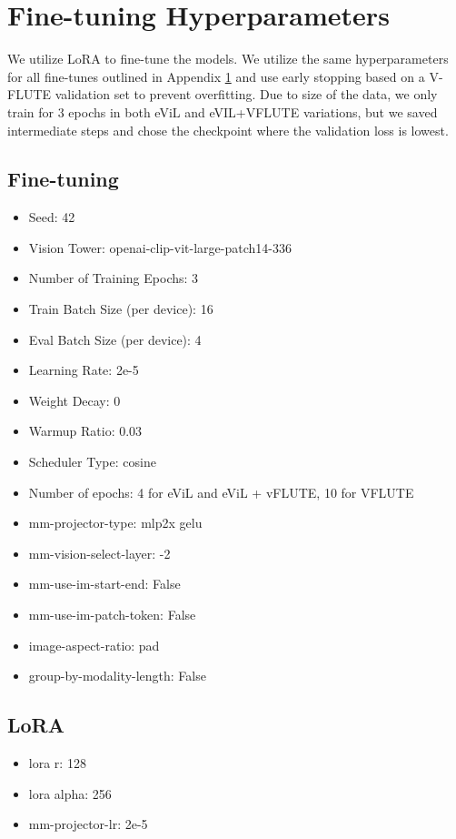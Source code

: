 \section{Fine-tuning Hyperparameters} \label{app:hyper}

We utilize LoRA \cite{hu2022lora} to fine-tune the models. We utilize the same hyperparameters for all fine-tunes outlined in Appendix \ref{app:hyper} and use early stopping based on a V-FLUTE validation set to prevent overfitting. Due to size of the data, we only train for 3 epochs in both eViL and eVIL+VFLUTE variations, but we saved intermediate steps and chose the checkpoint where the validation loss is lowest. 

\subsection*{Fine-tuning}
\begin{itemize}
    \item Seed: 42
    \item Vision Tower: openai-clip-vit-large-patch14-336
    \item Number of Training Epochs: 3
    \item Train Batch Size (per device): 16
    \item Eval Batch Size (per device): 4
    \item Learning Rate: 2e-5
    \item Weight Decay: 0
    \item Warmup Ratio: 0.03
    \item Scheduler Type: cosine
    \item Number of epochs: 4 for eViL and eViL + vFLUTE, 10 for VFLUTE
    \item mm-projector-type: mlp2x gelu 
    \item mm-vision-select-layer: -2 
    \item mm-use-im-start-end: False 
    \item mm-use-im-patch-token: False 
    \item image-aspect-ratio: pad 
    \item group-by-modality-length: False
\end{itemize}

\subsection*{LoRA}
\begin{itemize}
    \item lora r: 128 
    \item lora alpha: 256
    \item mm-projector-lr: 2e-5
\end{itemize}

